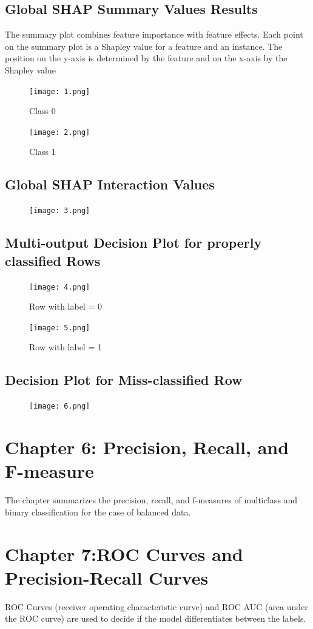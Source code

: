 \documentclass{article}
\begin{document}
\subsection{Global SHAP Summary Values Results}
The summary plot combines feature importance with feature effects. Each point on the summary plot is a Shapley value for a feature and an instance. The position on the y-axis is determined by the feature and on the x-axis by the Shapley value
\begin{figure}[H]
\centering
\texttt{[image: 1.png]}
\caption{Class 0}
\end{figure}
\begin{figure}[H]
\centering
\texttt{[image: 2.png]}
\caption{Class 1}
\end{figure}
\subsection{Global SHAP Interaction Values}
\begin{figure}[H]
\centering
\texttt{[image: 3.png]}
\end{figure}
\subsection{Multi-output Decision Plot for properly classified Rows}
\begin{figure}[H]
\centering
\texttt{[image: 4.png]}
\caption{Row with label = 0}
\end{figure}
\begin{figure}[H]
\centering
\texttt{[image: 5.png]}
\caption{Row with label = 1}
\end{figure}
\subsection{Decision Plot for Miss-classified Row}
\begin{figure}[H]
\centering
\texttt{[image: 6.png]}
\end{figure}

\section{Chapter 6: Precision, Recall, and F-measure}
The chapter summarizes the precision, recall, and f-measures of multiclass and binary classification for the case of balanced data.

\section{Chapter 7:ROC Curves and Precision-Recall
Curves}
ROC Curves (receiver operating characteristic curve) and ROC AUC (area under the ROC curve) are used to decide if the model differentiates between the labels. 
\end{document}
